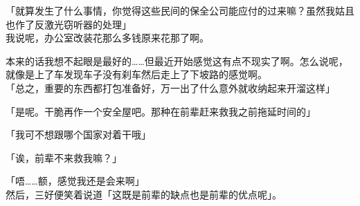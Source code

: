 「就算发生了什么事情，你觉得这些民间的保全公司能应付的过来嘛？虽然我姑且也作了反激光窃听器的处理」\\

我说呢，办公室改装花那么多钱原来花那了啊。

本来的话我想不起眼是最好的……但最近开始感觉这有点不现实了啊。怎么说呢，就像是上了车发现车子没有刹车然后走上了下坡路的感觉啊。\\

「总之，重要的东西都打包准备好，万一出了什么意外就收纳起来开溜这样」

「是呢。干脆再作一个安全屋吧。那种在前辈赶来救我之前拖延时间的」

「我可不想跟哪个国家对着干哦」

「诶，前辈不来救我嘛？」

「唔……额，感觉我还是会来啊」\\

然后，三好便笑着说道「这既是前辈的缺点也是前辈的优点呢」。\\
